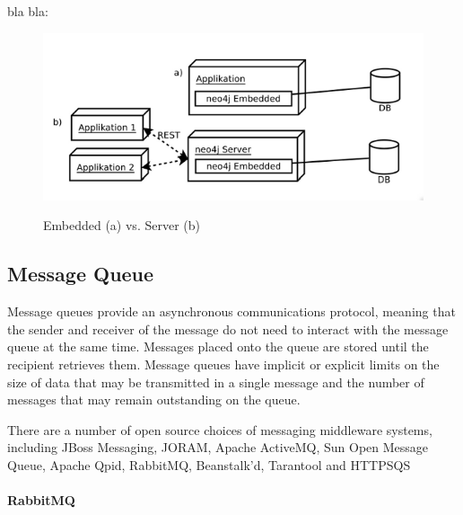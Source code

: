 bla bla:

\begin{figure}[htb]
  \centering
  \includegraphics[scale=0.4]{neo4j.png}\\
  \caption{Embedded (a) vs. Server (b)}
  \label{fig:neo4j}
\end{figure}



\subsection{Message Queue\label{sec:back_me_mid}}
Message queues provide an asynchronous communications protocol, meaning that the sender and receiver of the message do not need to interact with the message queue at the same time. Messages placed onto the queue are stored until the recipient retrieves them. Message queues have implicit or explicit limits on the size of data that may be transmitted in a single message and the number of messages that may remain outstanding on the queue.

There are a number of open source choices of messaging middleware systems, including JBoss Messaging, JORAM, Apache ActiveMQ, Sun Open Message Queue, Apache Qpid, RabbitMQ, Beanstalk'd, Tarantool and HTTPSQS

\paragraph{RabbitMQ}

